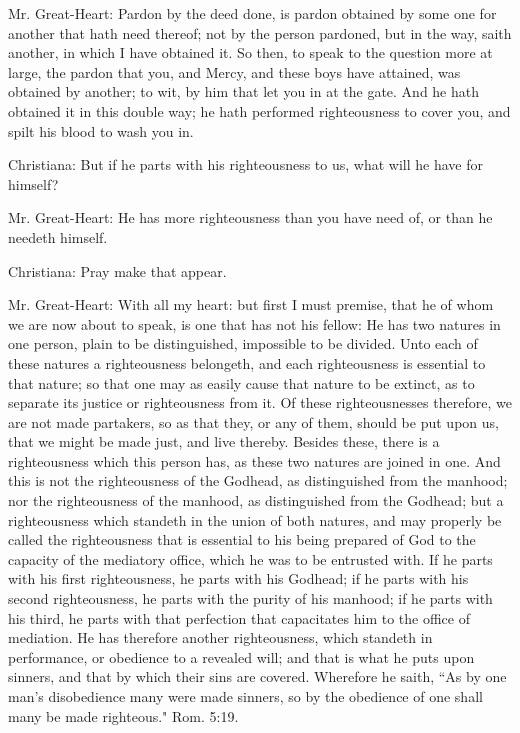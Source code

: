 Mr. Great-Heart: Pardon by the deed done, is pardon obtained by some one for another that hath need thereof; not by the person pardoned, but in the way, saith another, in which I have obtained it. So then, to speak to the question more at large, the pardon that you, and Mercy, and these boys have attained, was obtained by another; to wit, by him that let you in at the gate. And he hath obtained it in this double way; he hath performed righteousness to cover you, and spilt his blood to wash you in.

Christiana: But if he parts with his righteousness to us, what will he have for himself?

Mr. Great-Heart: He has more righteousness than you have need of, or than he needeth himself.

Christiana: Pray make that appear.

Mr. Great-Heart: With all my heart: but first I must premise, that he of whom we are now about to speak, is one that has not his fellow: He has two natures in one person, plain to be distinguished, impossible to be divided. Unto each of these natures a righteousness belongeth, and each righteousness is essential to that nature; so that one may as easily cause that nature to be extinct, as to separate its justice or righteousness from it. Of these righteousnesses therefore, we are not made partakers, so as that they, or any of them, should be put upon us, that we might be made just, and live thereby. Besides these, there is a righteousness which this person has, as these two natures are joined in one. And this is not the righteousness of the Godhead, as distinguished from the manhood; nor the righteousness of the manhood, as distinguished from the Godhead; but a righteousness which standeth in the union of both natures, and may properly be called the righteousness that is essential to his being prepared of God to the capacity of the mediatory office, which he was to be entrusted with. If he parts with his first righteousness, he parts with his Godhead; if he parts with his second righteousness, he parts with the purity of his manhood; if he parts with his third, he parts with that perfection that capacitates him to the office of mediation. He has therefore another righteousness, which standeth in performance, or obedience to a revealed will; and that is what he puts upon sinners, and that by which their sins are covered. Wherefore he saith, ``As by one man's disobedience many were made sinners, so by the obedience of one shall many be made righteous." Rom. 5:19.

